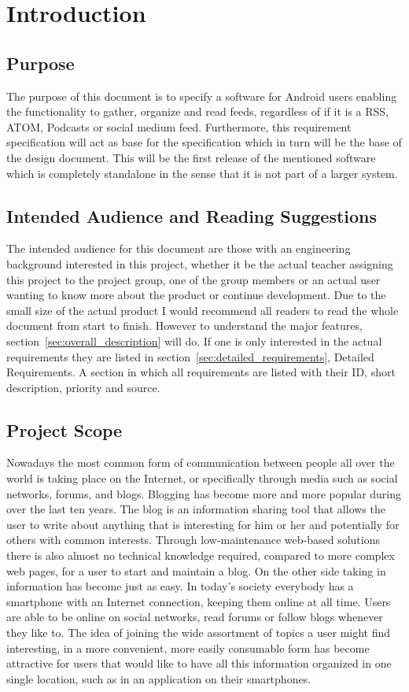 \section{Introduction}


\subsection{Purpose}
The purpose of this document is to specify a software for Android users enabling the functionality to gather, organize and read feeds, regardless of if it is a RSS\cite{rss-spec}, ATOM\cite{atom}, Podcasts or social medium feed. Furthermore, this requirement specification will act as base for the specification which in turn will be the base of the design document. This will be the first release of the mentioned software which is completely standalone in the sense that it is not part of a larger system.


\subsection{Intended Audience and Reading Suggestions}
The intended audience for this document are those with an engineering background interested in this project, whether it be the actual teacher assigning this project to the project group, one of the group members or an actual user wanting to know more about the product or continue development. Due to the small size of the actual product I would recommend all readers to read the whole document from start to finish. However to understand the major features, section~\ref{sec:overall_description} will do. If one is only interested in the actual requirements they are listed in section~\ref{sec:detailed_requirements}, Detailed Requirements. A section in which all requirements are listed with their ID, short description, priority and source.


\subsection{Project Scope}
Nowadays the most common form of communication between people all over the world is taking place on the Internet, or specifically through media such as social networks, forums, and blogs. Blogging has become more and more popular during over the last ten years. The blog is an information sharing tool that allows the user to write about anything that is interesting for him or her and potentially for others with common interests. Through low-maintenance web-based solutions there is also almost no technical knowledge required, compared to more complex web pages, for a user to start and maintain a blog. On the other side taking in information has become just as easy. In today's society everybody has a smartphone with an Internet connection, keeping them online at all time. Users are able to be online on social networks, read forums or follow blogs whenever they like to. The idea of joining the wide assortment of topics a user might find interesting, in a more convenient, more easily consumable form has become attractive for users that would like to have all this information organized in one single location, such as in an application on their smartphones.

